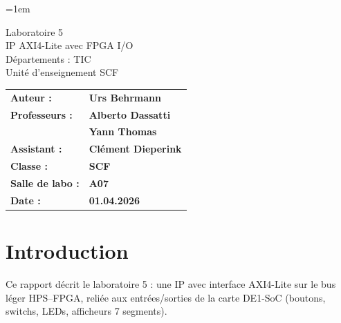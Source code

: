 \documentclass[a4paper,12pt]{article}
\author{Urs Behrmann}
\begin{document}
\emergencystretch=1em %

\thispagestyle{firstpage}


\vspace*{2cm}
\begin{center}
    \Huge Laboratoire 5 \\
    \vspace{0.2cm}
    \Large IP AXI4-Lite avec FPGA I/O\\
    \vspace{1cm}
    \small Départements : TIC\\
    Unité d'enseignement SCF\\
\end{center}

\vspace{9cm}

\renewcommand{\arraystretch}{1.5} %

\begin{flushleft} %
    \begin{tabular}{@{}l l@{}}
        \textbf{Auteur :}        & \textbf{Urs Behrmann} \\
        \textbf{Professeurs :}   & \textbf{Alberto Dassatti} \\
                                 & \textbf{Yann Thomas} \\
        \textbf{Assistant :}     & \textbf{Clément Dieperink} \\
        \textbf{Classe :}        & \textbf{SCF} \\
        \textbf{Salle de labo :} & \textbf{A07} \\
        \textbf{Date :}          & \textbf{01.04.2026} \\
    \end{tabular}
\end{flushleft}

\newpage

\pagestyle{otherpages}

\renewcommand{\contentsname}{Table des matières}
\tableofcontents

\newpage

\section{Introduction}

Ce rapport décrit le laboratoire 5 : une IP avec interface AXI4-Lite sur le bus léger HPS--FPGA, reliée aux entrées/sorties de la carte DE1-SoC (boutons, switchs, LEDs, afficheurs 7 segments).
\end{document}
